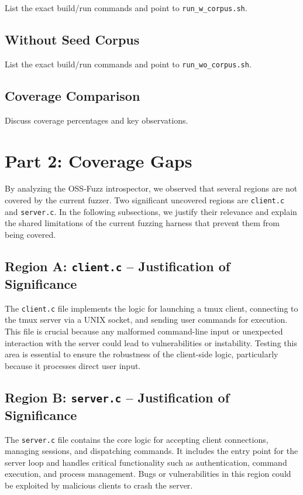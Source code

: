 \documentclass[11pt,a4paper,twocolumn]{article}
\begin{document}
List the exact build/run commands and point to \texttt{run\_w\_corpus.sh}.

\subsection{Without Seed Corpus}
List the exact build/run commands and point to \texttt{run\_wo\_corpus.sh}.

\subsection{Coverage Comparison}
Discuss coverage percentages and key observations.

\section{Part 2: Coverage Gaps}
By analyzing the OSS-Fuzz introspector, we observed that several regions are not covered by the current fuzzer. Two significant uncovered regions are \texttt{client.c} and \texttt{server.c}. In the following subsections, we justify their relevance and explain the shared limitations of the current fuzzing harness that prevent them from being covered.

\subsection{Region A: \texttt{client.c} – Justification of Significance}
The \texttt{client.c} file implements the logic for launching a tmux client, connecting to the tmux server via a UNIX socket, and sending user commands for execution. This file is crucial because any malformed command-line input or unexpected interaction with the server could lead to vulnerabilities or instability. Testing this area is essential to ensure the robustness of the client-side logic, particularly because it processes direct user input.

\subsection{Region B: \texttt{server.c} – Justification of Significance}
The \texttt{server.c} file contains the core logic for accepting client connections, managing sessions, and dispatching commands. It includes the entry point for the server loop and handles critical functionality such as authentication, command execution, and process management. Bugs or vulnerabilities in this region could be exploited by malicious clients to crash the server.
\end{document}
